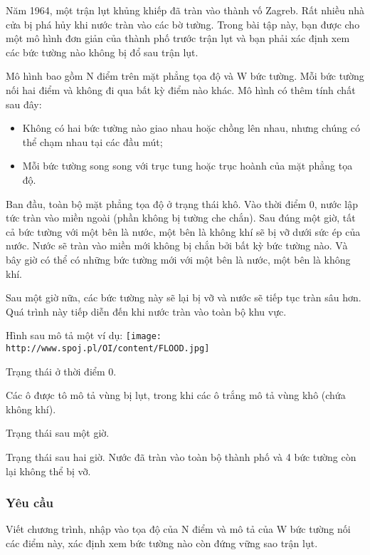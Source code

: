 



   Năm 1964, một trận lụt khủng khiếp đã tràn vào thành vố Zagreb. Rất nhiều nhà cửa bị phá hủy khi nước tràn vào các bờ tường. Trong bài tập này, bạn được cho một mô hình đơn giản của thành phố trước trận lụt và bạn phải xác định xem các bức tường nào không bị đổ sau trận lụt.  

   Mô hình bao gồm N điểm trên mặt phẳng tọa độ và W bức tường. Mỗi bức tường nối hai điểm và không đi qua bất kỳ điểm nào khác. Mô hình có thêm tính chất sau đây:  
\begin{itemize}
	\item     Không có hai bức tường nào giao nhau hoặc chồng lên nhau, nhưng chúng có thể chạm nhau tại các đầu mút;   
	\item     Mỗi bức tường song song với trục tung hoặc trục hoành của mặt phẳng tọa độ.   
\end{itemize}

   Ban đầu, toàn bộ mặt phẳng tọa độ ở trạng thái khô. Vào thời điểm 0, nước lập tức tràn vào miền ngoài (phần không bị tường che chắn). Sau đúng một giờ, tất cả bức tường với một bên là nước, một bên là không khí sẽ bị vỡ dưới sức ép của nước. Nước sẽ tràn vào miền mới không bị chắn bởi bất kỳ bức tường nào. Và bây giờ có thể có những bức tường mới với một bên là nước, một bên là không khí.  

   Sau một giờ nữa, các bức tường này sẽ lại bị vỡ và nước sẽ tiếp tục tràn sâu hơn. Quá trình này tiếp diễn đến khi nước tràn vào toàn bộ khu vực.  

   Hình sau mô tả một ví dụ:  
\texttt{[image: http://www.spoj.pl/OI/content/FLOOD.jpg]}

   Trạng thái ở thời điểm 0.  

   Các ô được tô mô tả vùng bị lụt, trong khi các ô trắng mô tả vùng khô (chứa không khí).  

   Trạng thái sau một giờ.  

   Trạng thái sau hai giờ. Nước đã tràn vào toàn bộ thành phố và 4 bức tường còn lại không thể bị vỡ.  

\subsubsection{   Yêu cầu  }

   Viết chương trình, nhập vào tọa độ của N điểm và mô tả của W bức tường nối các điểm này, xác định xem bức tường nào còn đứng vững sao trận lụt.  

